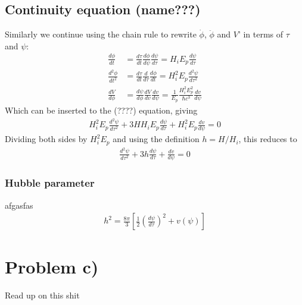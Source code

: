 \documentclass[reprint,english,notitlepage]{revtex4-1}  %
\numberwithin{equation}{section}
\begin{document}
\subsection{Continuity equation (name???)}
Similarly we continue using the chain rule to rewrite $\dot{\phi}$,
$\ddot{\phi}$ and $V$' in terms of $\tau$ and $\psi$:
\begin{align}
	\frac{d\phi}{dt} &= \frac{d\tau}{dt}\frac{d\phi}{d\psi}\frac{d\psi}{d\tau}
									 = H_i E_p \frac{d\psi}{d\tau} \\
  \frac{d^2\phi}{dt^2} &= \frac{d\tau}{dt}\frac{d}{d\tau}\frac{d\phi}{dt}
									 = H_i^2 E_p \frac{d^2\psi}{d\tau^2} \\
	\frac{dV}{d\phi} &= \frac{d\psi}{d\phi}\frac{dV}{dv}\frac{dv}{d\psi}
									 = \frac{1}{E_p} \frac{H_i^2 E_p^2}{\hbar c^3} \frac{dv}{d\psi}
\end{align}
Which can be inserted to the (????) equation, giving
\begin{align}
	H_i^2 E_p \frac{d^2\psi}{d\tau^2} + 3H H_i E_p \frac{d\psi}{d\tau}
				+ H_i^2 E_p \frac{dv}{d\psi} = 0
\end{align}
Dividing both sides by $H_i^2 E_p$ and using the definition $h=H/H_i$, this
reduces to
\begin{align}
	\frac{d^2\psi}{d\tau^2} + 3h\frac{d\psi}{d\tau} + \frac{dv}{d\psi} = 0 \label{eq:eom}
\end{align}
\subsubsection{Hubble parameter}
afgasfas
\begin{align}
	h^2 = \frac{8\pi}{3}\left[ \frac{1}{2}\left(\frac{d\psi}{d\tau}\right)^2 + v(\psi)\right] \label{eq:h}
\end{align}
\section{Problem c)}
Read up on this shit
\end{document}
